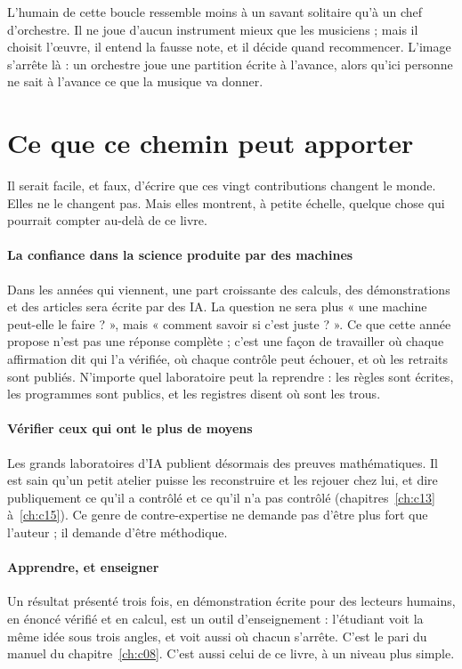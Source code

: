 \begin{analogie}
L'humain de cette boucle ressemble moins à un savant solitaire qu'à un chef d'orchestre. Il ne joue d'aucun
instrument mieux que les musiciens ; mais il choisit l'œuvre, il entend la fausse note, et il décide quand
recommencer. L'image s'arrête là : un orchestre joue une partition écrite à l'avance, alors qu'ici personne ne sait
à l'avance ce que la musique va donner.
\end{analogie}

\section{Ce que ce chemin peut apporter}

Il serait facile, et faux, d'écrire que ces vingt contributions changent le monde. Elles ne le changent pas. Mais
elles montrent, à petite échelle, quelque chose qui pourrait compter au-delà de ce livre.

\paragraph{La confiance dans la science produite par des machines} Dans les années qui viennent, une part croissante
des calculs, des démonstrations et des articles sera écrite par des IA. La question ne sera plus « une machine peut-elle
le faire ? », mais « comment savoir si c'est juste ? ». Ce que cette année propose n'est pas une réponse complète ;
c'est une façon de travailler où chaque affirmation dit qui l'a vérifiée, où chaque contrôle peut échouer, et où les
retraits sont publiés. N'importe quel laboratoire peut la reprendre : les règles sont écrites, les programmes sont
publics, et les registres disent où sont les trous.

\paragraph{Vérifier ceux qui ont le plus de moyens} Les grands laboratoires d'IA publient désormais des preuves
mathématiques. Il est sain qu'un petit atelier puisse les reconstruire et les rejouer chez lui, et dire publiquement
ce qu'il a contrôlé et ce qu'il n'a pas contrôlé (chapitres~\ref{ch:c13} à~\ref{ch:c15}). Ce genre de contre-expertise
ne demande pas d'être plus fort que l'auteur ; il demande d'être méthodique.

\paragraph{Apprendre, et enseigner} Un résultat présenté trois fois, en démonstration écrite pour des lecteurs humains, en énoncé vérifié et en
calcul, est un outil d'enseignement : l'étudiant voit la même idée sous trois angles, et voit aussi où chacun s'arrête.
C'est le pari du manuel du chapitre~\ref{ch:c08}. C'est aussi celui de ce livre, à un niveau plus simple.


